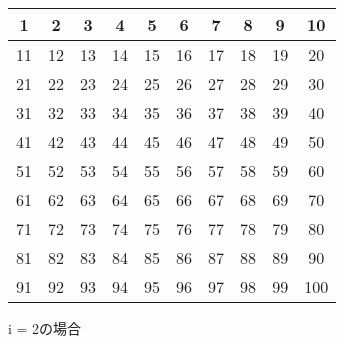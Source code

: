 \documentclass{jlreq}
\begin{document}
\begin{center}
  \begin{tabular}{|c|c|c|c|c|c|c|c|c|c|}
      \hline
      1  & 2  & 3  & 4  & 5  & 6  & 7  & 8  & 9  & 10 \\ \hline
      11 & 12 & 13 & 14 & 15 & 16 & 17 & 18 & 19 & 20 \\ \hline
      21 & 22 & 23 & 24 & 25 & 26 & 27 & 28 & 29 & 30 \\ \hline
      31 & 32 & 33 & 34 & 35 & 36 & 37 & 38 & 39 & 40 \\ \hline
      41 & 42 & 43 & 44 & 45 & 46 & 47 & 48 & 49 & 50 \\ \hline
      51 & 52 & 53 & 54 & 55 & 56 & 57 & 58 & 59 & 60 \\ \hline
      61 & 62 & 63 & 64 & 65 & 66 & 67 & 68 & 69 & 70 \\ \hline
      71 & 72 & 73 & 74 & 75 & 76 & 77 & 78 & 79 & 80 \\ \hline
      81 & 82 & 83 & 84 & 85 & 86 & 87 & 88 & 89 & 90 \\ \hline
      91 & 92 & 93 & 94 & 95 & 96 & 97 & 98 & 99 & 100 \\ \hline
  \end{tabular}

\end{center}
\vspace{0.1cm}


\begin{center}
    i = 2の場合
\end{center}

\vspace{0.5cm}
\end{document}
